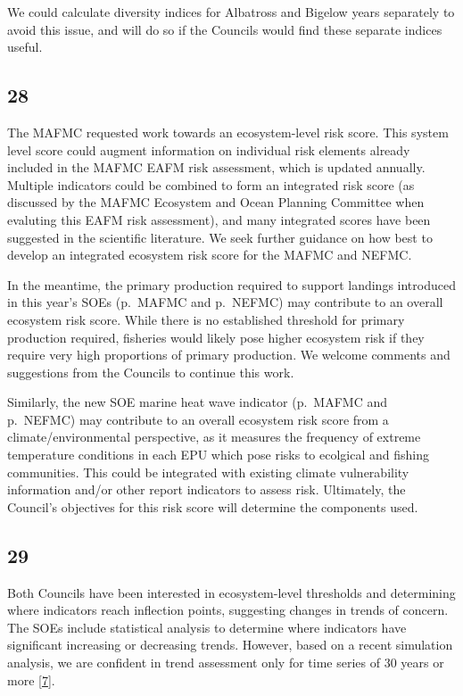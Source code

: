 \documentclass[
  10pt,
]{article}
\begin{document}
We could calculate diversity indices for Albatross and Bigelow years
separately to avoid this issue, and will do so if the Councils would
find these separate indices useful.

\hypertarget{section-27}{%
\subsection{28}\label{section-27}}

The MAFMC requested work towards an ecosystem-level risk score. This
system level score could augment information on individual risk elements
already included in the MAFMC EAFM risk assessment, which is updated
annually. Multiple indicators could be combined to form an integrated
risk score (as discussed by the MAFMC Ecosystem and Ocean Planning
Committee when evaluting this EAFM risk assessment), and many integrated
scores have been suggested in the scientific literature. We seek further
guidance on how best to develop an integrated ecosystem risk score for
the MAFMC and NEFMC.

In the meantime, the primary production required to support landings
introduced in this year's SOEs (p.~MAFMC and p.~NEFMC) may contribute to
an overall ecosystem risk score. While there is no established threshold
for primary production required, fisheries would likely pose higher
ecosystem risk if they require very high proportions of primary
production. We welcome comments and suggestions from the Councils to
continue this work.

Similarly, the new SOE marine heat wave indicator (p.~MAFMC and
p.~NEFMC) may contribute to an overall ecosystem risk score from a
climate/environmental perspective, as it measures the frequency of
extreme temperature conditions in each EPU which pose risks to ecolgical
and fishing communities. This could be integrated with existing climate
vulnerability information and/or other report indicators to assess risk.
Ultimately, the Council's objectives for this risk score will determine
the components used.

\hypertarget{section-28}{%
\subsection{29}\label{section-28}}

Both Councils have been interested in ecosystem-level thresholds and
determining where indicators reach inflection points, suggesting changes
in trends of concern. The SOEs include statistical analysis to determine
where indicators have significant increasing or decreasing trends.
However, based on a recent simulation analysis, we are confident in
trend assessment only for time series of 30 years or more
{[}\protect\hyperlink{ref-hardison_simulation_2019}{7}{]}.
\end{document}
